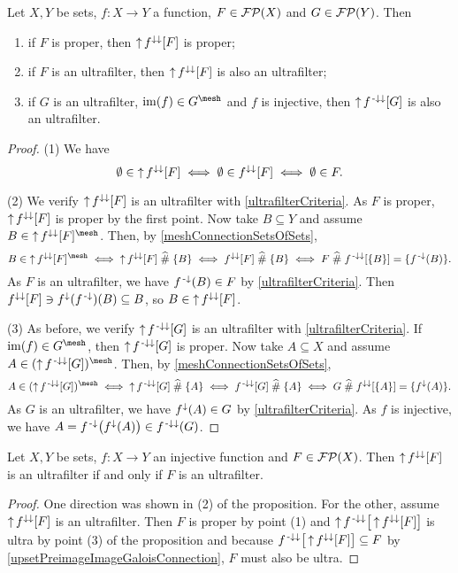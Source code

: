 \begin{proposition} \label{imageFilterProperties}
Let $X, Y$ be sets, $f: X\to Y$ a function, $F\in\operatorname{\mathcal{FP}}(X)$ and $G\in\operatorname{\mathcal{FP}}(Y)$. Then
\begin{enumerate}
\item if $F$ is proper, then $\operatorname{\uparrow} f^{\downarrow\downarrow}[F]$ is proper;
\item if $F$ is an ultrafilter, then $\operatorname{\uparrow} f^{\downarrow\downarrow}[F]$ is also an ultrafilter;
\item if $G$ is an ultrafilter, $\im(f)\in G^\mesh$ and $f$ is injective, then $\operatorname{\uparrow} f^{{\text{\hspace{0.15em}-}\downarrow}\downarrow}[G]$ is also an ultrafilter.
\end{enumerate}
\end{proposition}
\begin{proof}
(1) We have
\[ \emptyset \in \operatorname{\uparrow} f^{\downarrow\downarrow}[F] \iff \emptyset\in f^{\downarrow\downarrow}[F] \iff \emptyset\in F. \]

(2) We verify $\operatorname{\uparrow} f^{\downarrow\downarrow}[F]$ is an ultrafilter with \ref{ultrafilterCriteria}. As $F$ is proper, $\operatorname{\uparrow} f^{\downarrow\downarrow}[F]$ is proper by the first point. Now take $B\subseteq Y$ and assume $B\in \upset f^{\imf\imf}[F]^\mesh$. Then, by \ref{meshConnectionSetsOfSets},
\[ B\in \upset f^{\imf\imf}[F]^\mesh \iff \upset f^{\imf\imf}[F] \amesh \{B\} \iff f^{\imf\imf}[F] \amesh \{B\} \iff F \amesh f^{\preimf\imf}[\{B\}] = \{f^\preimf(B)\}. \]
As $F$ is an ultrafilter, we have $f^{\text{\hspace{0.15em}-}\downarrow}(B) \in F$ by \ref{ultrafilterCriteria}. Then $f^{\downarrow\downarrow}[F] \ni f^\downarrow(f^{\text{\hspace{0.15em}-}\downarrow})(B) \subseteq B$, so $B\in \operatorname{\uparrow} f^{\downarrow\downarrow}[F]$.

(3) As before, we verify $\operatorname{\uparrow} f^{{\text{\hspace{0.15em}-}\downarrow}\downarrow}[G]$ is an ultrafilter with \ref{ultrafilterCriteria}. If $\im(f)\in G^\mesh$, then $\operatorname{\uparrow} f^{{\text{\hspace{0.15em}-}\downarrow}\downarrow}[G]$ is proper. Now take $A\subseteq X$ and assume $A\in (\upset f^{\preimf\imf}[G])^\mesh$. Then, by \ref{meshConnectionSetsOfSets},
\[ A\in (\upset f^{\preimf\imf}[G])^\mesh \iff \upset f^{\preimf\imf}[G] \amesh \{A\} \iff f^{\preimf\imf}[G] \amesh \{A\} \iff G \amesh f^{\imf\imf}[\{A\}] = \{f^\imf(A)\}. \]
As $G$ is an ultrafilter, we have $f^\downarrow(A) \in G$ by \ref{ultrafilterCriteria}. As $f$ is injective, we have $A = f^{{\text{\hspace{0.15em}-}\downarrow}}\big(f^\downarrow(A)\big) \in f^{{\text{\hspace{0.15em}-}\downarrow}\downarrow}(G)$.
\end{proof}
\begin{corollary} \label{imageFilterUltraIffUltra}
Let $X, Y$ be sets, $f: X\to Y$ an injective function and $F\in\operatorname{\mathcal{FP}}(X)$. Then $\operatorname{\uparrow} f^{\downarrow\downarrow}[F]$ is an ultrafilter \textup{if and only if} $F$ is an ultrafilter.
\end{corollary}
\begin{proof}
One direction was shown in (2) of the proposition. For the other, assume $\operatorname{\uparrow} f^{\downarrow\downarrow}[F]$ is an ultrafilter. Then $F$ is proper by point (1) and $\operatorname{\uparrow} f^{{\text{\hspace{0.15em}-}\downarrow}\downarrow}\big[\operatorname{\uparrow} f^{\downarrow\downarrow}[F]\big]$ is ultra by point (3) of the proposition and because $f^{{\text{\hspace{0.15em}-}\downarrow}\downarrow}\big[\operatorname{\uparrow} f^{\downarrow\downarrow}[F]\big] \subseteq F$ by \ref{upsetPreimageImageGaloisConnection}, $F$ must also be ultra.  
\end{proof}


